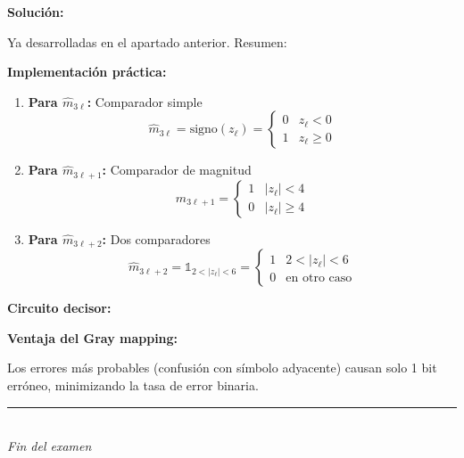 \documentclass[11pt,a4paper]{article}
\begin{document}
\vspace{0.3cm}
\textbf{Soluci\'on:}

Ya desarrolladas en el apartado anterior. Resumen:

\textbf{Implementaci\'on pr\'actica:}

\begin{enumerate}
    \item \textbf{Para $\hat{m}_{3\ell}$:} Comparador simple
    \[
    \hat{m}_{3\ell} = \text{signo}(z_\ell) = \begin{cases}
    0 & z_\ell < 0 \\
    1 & z_\ell \geq 0
    \end{cases}
    \]
    
    \item \textbf{Para $\hat{m}_{3\ell+1}$:} Comparador de magnitud
    \[
    \hat{m}_{3\ell+1} = \begin{cases}
    1 & |z_\ell| < 4 \\
    0 & |z_\ell| \geq 4
    \end{cases}
    \]
    
    \item \textbf{Para $\hat{m}_{3\ell+2}$:} Dos comparadores
    \[
    \hat{m}_{3\ell+2} = \mathbb{1}_{2 < |z_\ell| < 6} = \begin{cases}
    1 & 2 < |z_\ell| < 6 \\
    0 & \text{en otro caso}
    \end{cases}
    \]
\end{enumerate}

\textbf{Circuito decisor:}

\begin{center}
\end{center}

\textbf{Ventaja del Gray mapping:}

Los errores m\'as probables (confusi\'on con s\'imbolo adyacente) causan solo 1 bit err\'oneo, minimizando la tasa de error binaria.



\vspace{1cm}
\begin{center}
\rule{0.8\linewidth}{0.4pt}\\
\textit{Fin del examen}
\end{center}
\end{document}
